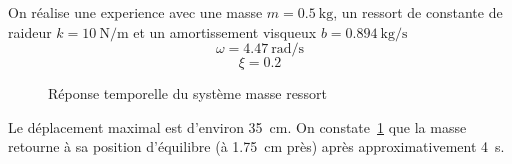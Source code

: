 On réalise une experience avec une masse $m=\SI{0.5}{\kilogram}$, un ressort 
de constante de raideur $k=\SI{10}{\newton\per\meter}$ et un amortissement 
visqueux $b=\SI{0.894}{\kilogram\per\second}$
\[
    \omega=\SI{4.47}{\radian\per\second}
\]
\[
    \xi=0.2
\]
\begin{figure}[!h]
    \centering
    
    \caption{Réponse temporelle du système masse ressort
    \label{fig-masse_ressort_reptemp}}
\end{figure}
Le déplacement maximal est d'environ \SI{35}{\centi\meter}. On 
constate~\cref{fig-masse_ressort_reptemp} que la masse retourne 
à sa position d'équilibre (à \SI{1.75}{\centi\meter} près) après 
approximativement \SI{4}{\second}.

